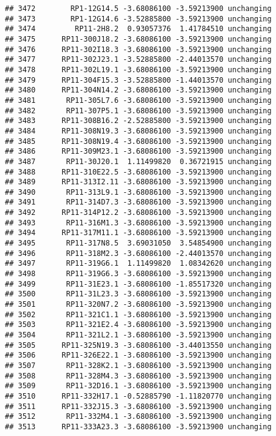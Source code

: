 \documentclass[]{article}
\begin{document}
\begin{verbatim}
## 3472        RP1-12G14.5 -3.68086100 -3.59213900 unchanging
## 3473        RP1-12G14.6 -3.52885800 -3.59213900 unchanging
## 3474         RP11-2H8.2  0.93057376  1.41784510 unchanging
## 3475      RP11-300J18.2 -3.68086100 -3.59213900 unchanging
## 3476      RP11-302I18.3 -3.68086100 -3.59213900 unchanging
## 3477      RP11-302J23.1 -3.52885800 -2.44013570 unchanging
## 3478      RP11-302L19.1 -3.68086100 -3.59213900 unchanging
## 3479      RP11-304F15.3 -3.52885800 -1.44013570 unchanging
## 3480      RP11-304N14.2 -3.68086100 -3.59213900 unchanging
## 3481       RP11-305L7.6 -3.68086100 -3.59213900 unchanging
## 3482       RP11-307P5.1 -3.68086100 -3.59213900 unchanging
## 3483      RP11-308B16.2 -2.52885800 -3.59213900 unchanging
## 3484      RP11-308N19.3 -3.68086100 -3.59213900 unchanging
## 3485      RP11-308N19.4 -3.68086100 -3.59213900 unchanging
## 3486      RP11-309M23.1 -3.68086100 -3.59213900 unchanging
## 3487       RP11-30J20.1  1.11499820  0.36721915 unchanging
## 3488      RP11-310E22.5 -3.68086100 -3.59213900 unchanging
## 3489      RP11-313I2.11 -3.68086100 -3.59213900 unchanging
## 3490       RP11-313L9.1 -3.68086100 -3.59213900 unchanging
## 3491       RP11-314D7.3 -3.68086100 -3.59213900 unchanging
## 3492      RP11-314P12.2 -3.68086100 -3.59213900 unchanging
## 3493       RP11-316M1.3 -3.68086100 -3.59213900 unchanging
## 3494      RP11-317M11.1 -3.68086100 -3.59213900 unchanging
## 3495       RP11-317N8.5  3.69031050  3.54854900 unchanging
## 3496       RP11-318M2.3 -3.68086100 -2.44013570 unchanging
## 3497       RP11-319G6.1  1.11499820  1.08342620 unchanging
## 3498       RP11-319G6.3 -3.68086100 -3.59213900 unchanging
## 3499       RP11-31E23.1 -3.68086100 -1.85517320 unchanging
## 3500       RP11-31L23.3 -3.68086100 -3.59213900 unchanging
## 3501       RP11-320N7.2 -3.68086100 -3.59213900 unchanging
## 3502       RP11-321C1.1 -3.68086100 -3.59213900 unchanging
## 3503       RP11-321E2.4 -3.68086100 -3.59213900 unchanging
## 3504       RP11-321L2.1 -3.68086100 -3.59213900 unchanging
## 3505      RP11-325N19.3 -3.68086100 -3.44013550 unchanging
## 3506      RP11-326E22.1 -3.68086100 -3.59213900 unchanging
## 3507       RP11-328K2.1 -3.68086100 -3.59213900 unchanging
## 3508       RP11-328M4.3 -3.68086100 -3.59213900 unchanging
## 3509       RP11-32D16.1 -3.68086100 -3.59213900 unchanging
## 3510      RP11-332H17.1 -0.52885790 -1.11820770 unchanging
## 3511      RP11-332J15.3 -3.68086100 -3.59213900 unchanging
## 3512       RP11-332M4.1 -3.68086100 -3.59213900 unchanging
## 3513      RP11-333A23.3 -3.68086100 -3.59213900 unchanging

\end{verbatim}
\end{document}
